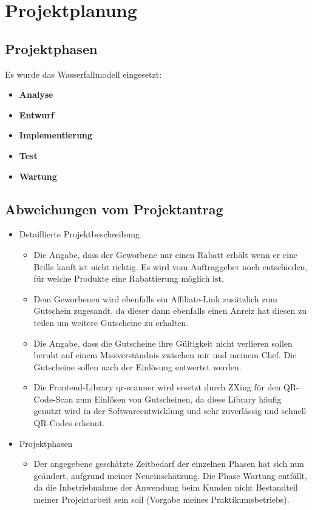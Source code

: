 \section{Projektplanung}
\label{sec:Projektplanung}

\subsection{Projektphasen}
\label{sec:Projektphasen}
Es wurde das Wasserfallmodell eingesetzt:
\begin{itemize}
  \item \textbf{Analyse}
  \item \textbf{Entwurf}
  \item \textbf{Implementierung}
  \item \textbf{Test}
  \item \textbf{Wartung}
\end{itemize}

\subsection{Abweichungen vom Projektantrag}
\label{sec:AbweichungenProjektantrag}

\begin{itemize}
	\item Detaillierte Projektbeschreibung
    \begin{itemize}
        \item Die Angabe, dass der Geworbene nur einen Rabatt erhält wenn er eine Brille kauft ist nicht richtig. Es wird vom Auftraggeber noch entschieden, für welche Produkte eine Rabattierung möglich ist.
        \item Dem Geworbenen wird ebenfalls ein Affiliate-Link zusätzlich zum Gutschein zugesandt, da dieser dann ebenfalls einen Anreiz hat diesen zu teilen um weitere Gutscheine zu erhalten.
        \item Die Angabe, dass die Gutscheine ihre Gültigkeit nicht verlieren sollen beruht auf einem Missverständnis zwischen mir und meinem Chef. Die Gutscheine sollen nach der Einlösung entwertet werden.
        \item Die Frontend-Library qr-scanner wird ersetzt durch \ac{ZXing} für den QR-Code-Scan zum Einlösen von Gutscheinen, da diese Library häufig genutzt wird in der Softwareentwicklung und sehr zuverlässig und schnell QR-Codes erkennt.
    \end{itemize}
        \item Projektphasen
    \begin{itemize}
        \item Der angegebene geschätzte Zeitbedarf der einzelnen Phasen hat sich nun geändert, aufgrund meiner Neueinschätzung. Die Phase Wartung entfällt, da die Inbetriebnahme der Anwendung beim Kunden nicht Bestandteil meiner Projektarbeit sein soll (Vorgabe meines Praktikumsbetriebs).
    \end{itemize}
\end{itemize}

